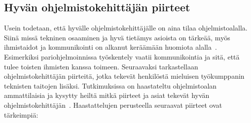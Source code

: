 \documentclass[finnish]{../tktltiki2}
\theoremstyle{definition}
\theoremstyle{remark}
\begin{document}
\subsection{Hyvän ohjelmistokehittäjän piirteet}

Usein todetaan, että hyvälle ohjelmistokehittäjälle on aina tilaa ohjelmistoalalla.
Siinä missä tekninen osaaminen ja hyvä tietämys asioista on
tärkeää, myös ihmistaidot ja kommunikointi on alkanut keräämään
huomiota alalla~\cite{Hall:2007:CNT:1235000.1235043}. Esimerkiksi
pariohjelmoinnissa työskentely vaatii kommunikointia ja sitä, että
tulee toisten ihmisten kanssa toimeen. Seuraavaksi tarkastellaan ohjelmistokehittäjän piirteitä, jotka tekevät henkilöstä mieluisen työkumppanin teknisten taitojen lisäksi.
Tutkimuksissa
on haastateltu ohjelmistoalan ammattilaisia ja kysytty heiltä mitkä
piirteet ja asiat tekevät hyvän ohjelmistokehittäjän~\cite{Acuna:2008:ESP:1414004.1414056,Begel:2008:PPW:1414004.1414026,Hall:2007:CNT:1235000.1235043}. Haastattelujen perusteella seuraavat piirteet ovat tärkeimpiä:
\end{document}
